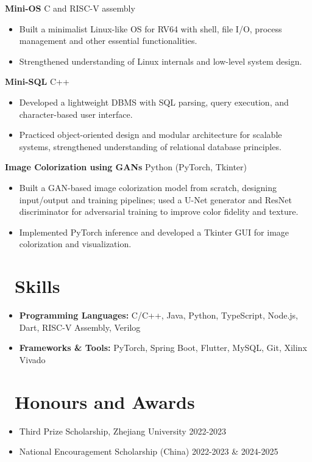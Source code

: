 \documentclass[11pt]{article}
\newlength{\interProjectSpacing}
\newcommand{\projectsep}{\vspace{\interProjectSpacing}}
\newlength{\intraProjectTitleSep}
\newcommand{\titlebreak}{\\[\intraProjectTitleSep]}
\begin{document}
\textbf{Mini-OS} \hfill C and RISC-V assembly \titlebreak
\begin{itemize}[nosep]
    \item Built a minimalist Linux-like OS for RV64 with shell, file I/O, process management and other essential functionalities.
    \item Strengthened understanding of Linux internals and low-level system design.
\end{itemize}

\projectsep

\textbf{Mini-SQL} \hfill C++ \titlebreak
\begin{itemize}[nosep]
    \item Developed a lightweight DBMS with SQL parsing, query execution, and character-based user interface.
    \item Practiced object-oriented design and modular architecture for scalable systems, strengthened understanding of relational database principles.
\end{itemize}

\projectsep

\textbf{Image Colorization using GANs} \hfill Python (PyTorch, Tkinter) \titlebreak
\begin{itemize}[nosep]
    \item Built a GAN-based image colorization model from scratch, designing input/output and training pipelines; used a U-Net generator and ResNet discriminator for adversarial training to improve color fidelity and texture.
    \item Implemented PyTorch inference and developed a Tkinter GUI for image colorization and visualization.
\end{itemize}

\section{\makebox[\widthof{\faCogs}][c]{\color{CVBlue}\faCogs}\ Skills}
\begin{itemize}[nosep]
    \item \textbf{Programming Languages:} C/C++, Java, Python, TypeScript, Node.js, Dart, RISC-V Assembly, Verilog
    \item \textbf{Frameworks \& Tools:} PyTorch, Spring Boot, Flutter, MySQL, Git, Xilinx Vivado
\end{itemize}

\section{\makebox[\widthof{\faTrophy}][c]{\color{CVBlue}\faTrophy}\ Honours and Awards}
\begin{itemize}
    \item Third Prize Scholarship, Zhejiang University \hfill 2022-2023
    \item National Encouragement Scholarship (China) \hfill 2022-2023 \& 2024-2025
\end{itemize}
\end{document}
